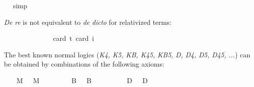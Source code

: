 \begin{isabellebody}
\ %
%
\isamarkupfalse%
\ simp%
%
%
%
\begin{isamarkuptext}%
\emph{De re} is not equivalent to \emph{de dicto} for relativized terms:%
\end{isamarkuptext}\isamarkuptrue%
\isamarkupfalse%
\ {\isachardoublequoteopen}{\isasymlfloor}\isactrlbold {\isasymforall}{\isasymalpha}{\isachardot}\ {\isacharparenleft}{\isacharparenleft}{\isasymlambda}{\isasymbeta}{\isachardot}\ \isactrlbold {\isasymbox}{\isacharparenleft}{\isasymalpha}\ {\isasymbeta}{\isacharparenright}{\isacharparenright}\ \isactrlbold {\isasymdown}{\isacharparenleft}{\isasymtau}{\isacharcolon}{\isacharcolon}{\isasymup}{\isasymlangle}{\isasymzero}{\isasymrangle}{\isacharparenright}{\isacharparenright}\ \isactrlbold {\isasymleftrightarrow}\ \isactrlbold {\isasymbox}{\isacharparenleft}{\isacharparenleft}{\isasymlambda}{\isasymbeta}{\isachardot}\ {\isacharparenleft}{\isasymalpha}\ {\isasymbeta}{\isacharparenright}{\isacharparenright}\ \isactrlbold {\isasymdown}{\isasymtau}{\isacharparenright}{\isasymrfloor}{\isachardoublequoteclose}\ \isanewline
\ \ \isamarkupfalse%
{\isacharbrackleft}card\ {\isacharprime}t{\isacharequal}{}{\isacharcomma}\ card\ i{\isacharequal}{}{\isacharbrackright}%
\ %
%
\isamarkupfalse%
\ %
%
%
%
%
\isamarkuptrue%
%
\begin{isamarkuptext}%
The best known normal logics (\emph{K4, K5, KB, K45, KB5, D, D4, D5, D45, ...}) can be obtained by
 combinations of the following axioms:%
\end{isamarkuptext}\isamarkuptrue%
\ \ \isamarkupfalse%
\ M\ \ \ {\isachardoublequoteopen}M\ {\isasymequiv}\ \isactrlbold {\isasymforall}{\isasymphi}{\isachardot}\ \isactrlbold {\isasymbox}{\isasymphi}\ \isactrlbold {\isasymrightarrow}\ {\isasymphi}{\isachardoublequoteclose}\isanewline
\ \ \isamarkupfalse%
\ B\ \ \ {\isachardoublequoteopen}B\ {\isasymequiv}\ \isactrlbold {\isasymforall}{\isasymphi}{\isachardot}\ {\isasymphi}\ \isactrlbold {\isasymrightarrow}\ \ \isactrlbold {\isasymbox}\isactrlbold {\isasymdiamond}{\isasymphi}{\isachardoublequoteclose}\isanewline
\ \ \isamarkupfalse%
\ D\ \ \ {\isachardoublequoteopen}D\ {\isasymequiv}\ \isactrlbold {\isasymforall}{\isasymphi}{\isachardot}\ \isactrlbold {\isasymbox}{\isasymphi}\ \isactrlbold {\isasymrightarrow}\ \isactrlbold {\isasymdiamond}{\isasymphi}{\isachardoublequoteclose}\isanewline

\end{isabellebody}
